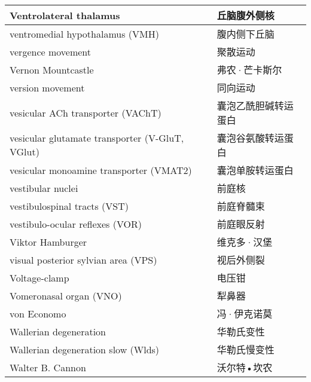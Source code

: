 \begin{longtable}{lll}
	\midrule
	Ventrolateral thalamus   && 丘脑腹外侧核  \\
	
	\midrule
	ventromedial hypothalamus (VMH)  && 腹内侧下丘脑  \\
	
	\midrule
	vergence movement   && 聚散运动  \\
	
	\midrule
	Vernon Mountcastle   && 弗农·芒卡斯尔  \\
	
	\midrule
	version movement   && 同向运动  \\
	
	\midrule
	vesicular ACh transporter (VAChT)   && 囊泡乙酰胆碱转运蛋白  \\
	
	\midrule
	vesicular glutamate transporter (V-GluT, VGlut)   && 囊泡谷氨酸转运蛋白  \\
	
	\midrule
	vesicular monoamine transporter (VMAT2)   && 囊泡单胺转运蛋白  \\
	
	\midrule
	vestibular nuclei   && 前庭核  \\
	
	\midrule
	vestibulospinal tracts (VST)   && 前庭脊髓束  \\
	
	\midrule
	vestibulo-ocular reflexes (VOR)   && 前庭眼反射  \\
	
	\midrule
	Viktor Hamburger   && 维克多·汉堡  \\
	
	\midrule
	visual posterior sylvian area (VPS)   && 视后外侧裂  \\
	
	\midrule
	Voltage-clamp  && 电压钳  \\
	
	\midrule
	Vomeronasal organ (VNO)  && 犁鼻器  \\
	
	\midrule
	von Economo   && 冯·伊克诺莫  \\
	
	\midrule
	Wallerian degeneration  && 华勒氏变性  \\
	
	\midrule
	Wallerian degeneration slow (Wlds) && 华勒氏慢变性  \\
	
	\midrule
	Walter B. Cannon  && 沃尔特•坎农  \\
	

\end{longtable}
